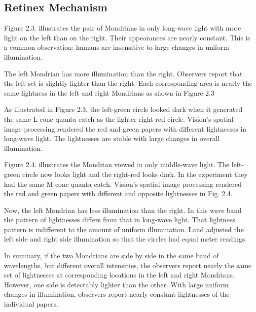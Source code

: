 \subsection{Retinex Mechanism}
Figure 2.3. illustrates the pair of Mondrians in only long-wave light with more light on the left than on the right. Their appearances are nearly constant. This is a common observation: humans are insensitive to large changes in uniform illumination.


The left Mondrian has more illumination than the right. Observers report that the left set is slightly lighter than the right. Each corresponding area is nearly the same lightness in the left and right Mondrians as shown in Figure 2.3

As illustrated in Figure 2.3, the left-green circle looked dark when it generated the same L cone quanta catch as the lighter right-red circle. Vision’s spatial image processing rendered the red and green papers with different lightnesses in long-wave light. The lightnesses are stable with large changes in overall illumination.

Figure 2.4. illustrates the Mondrian viewed in only middle-wave light. The left-green circle now looks light and the right-red looks dark. In the experiment they had the same M cone quanta catch. Vision’s spatial image processing rendered the red and green papers with different and opposite lightnesses in Fig. 2.4.


Now, the left Mondrian has less illumination than the right. In this wave band the pattern of lightnesses differs from that in long-wave light. That lightness pattern is indifferent to the amount of uniform illumination. Land adjusted the left side and right side illumination so that the circles had equal meter readings

In summary, if the two Mondrians are side by side in the same band of wavelengths, but different overall intensities, the observers report nearly the same set of lightnesses at corresponding locations in the left and right Mondrians. However, one side is detectably lighter than the other. With large uniform changes in illumination, observers report nearly constant lightnesses of the individual papers.

